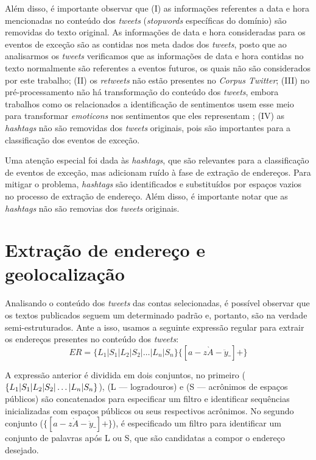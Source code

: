 \documentclass[
	12pt,				%
	oneside,			%
	a4paper,			%
	english,			%
	brazil				%
	]{abntex2ppgsi}
\begin{document}
{{Além disso, é importante observar que (I) as informações referentes a data e hora mencionadas no conteúdo dos \textit{tweets} (\textit{stopwords} específicas do domínio) são removidas do texto original. As informações de data e hora consideradas para os eventos de exceção são as contidas nos meta dados dos \textit{tweets}, posto que ao analisarmos os \textit{tweets} verificamos que as informações de data e hora contidas no texto normalmente são referentes a eventos futuros, os quais não são considerados por este trabalho; (II) os \textit{retweets} não estão presentes no \textit{Corpus Twitter}; (III) no pré-processamento não há transformação do conteúdo dos \textit{tweets}, embora trabalhos como os relacionados a identificação de sentimentos usem esse meio para transformar \textit{emoticons} nos sentimentos que eles representam \cite{Zagal2016}; (IV) as \textit {hashtags} não são removidas dos \textit{tweets} originais, pois são importantes para a classificação dos eventos de exceção.

Uma atenção especial foi dada às \textit{hashtags}, que são relevantes para a classificação de eventos de exceção, mas adicionam ruído à fase de extração de endereços. Para mitigar o problema, \textit{hashtags} são identificados e substituídos por espaços vazios no processo de extração de endereço. Além disso, é importante notar que as \textit{hashtags} não são removias dos \textit{tweets} originais.

\section{Extração de endereço e geolocalização}

Analisando o conteúdo dos \textit{tweets} das contas selecionadas, é possível observar que os textos publicados seguem um determinado padrão e, portanto, são na verdade semi-estruturados. Ante a isso, usamos a seguinte expressão regular para extrair os endereços presentes no conteúdo dos \textit{tweets}:
%
\begin{equation}
ER = \lbrace L_1 | S_1 | L_2 | S_2 | \dots | L_n | S_n \rbrace \lbrace [a-z\grave{A}-\ddot{y}\_] + \rbrace
\end{equation}

A expressão anterior é dividida em dois conjuntos, no primeiro ($\lbrace L_1 | S_1 | L_2 | S_2 | \newline \dots | L_n | S_n \rbrace $), (L --- logradouros) e (S --- acrônimos de espaços públicos) são concatenados para especificar um filtro e identificar sequências inicializadas com espaços públicos ou seus respectivos acrônimos. No segundo conjunto ($\lbrace [a-z\grave{A}-\ddot{y}\_] + \rbrace $), é especificado um filtro para identificar um conjunto de palavras após L ou S, que são candidatas a compor o endereço desejado.

}}
\end{document}
